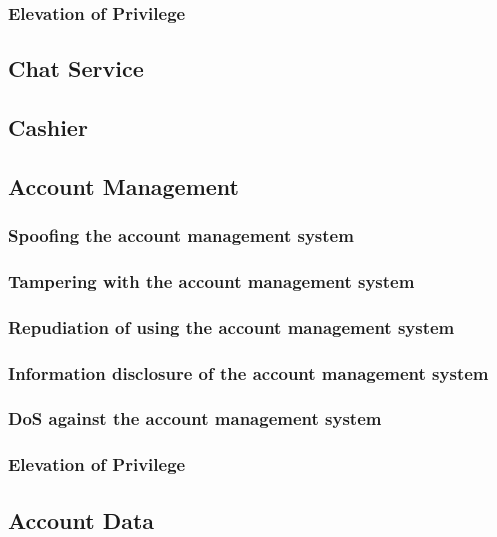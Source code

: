 \documentclass[a4paper,11pt]{report}
\begin{document}
\subsubsection{Elevation of Privilege}
\subsection{Chat Service}
\subsection{Cashier}
\subsection{Account Management}
\subsubsection{Spoofing the account management system}
\subsubsection{Tampering with the account management system}
\subsubsection{Repudiation of using the account management system}
\subsubsection{Information disclosure of the account management system}
\subsubsection{DoS against the account management system}
\subsubsection{Elevation of Privilege}
\subsection{Account Data}
\end{document}
